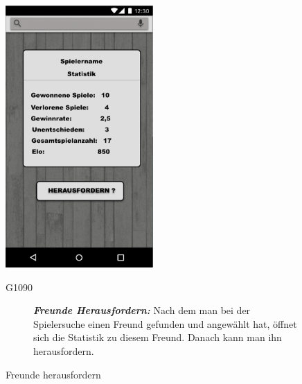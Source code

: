 \documentclass[parskip=full]{scrartcl}
\begin{document}
\begin{figure}[htp]
	\begin{minipage}[t]{6cm}
		\vspace{0pt}
		\includegraphics[height=100mm]{spielerprofil.png}
		\caption{Freunde herausfordern}
		\label{fig:Freunde herausforern}
	\end{minipage}
	\hfill
	\begin{minipage}[t]{6cm}
		\vspace{0pt}
		\begin{description}
			\item[G1090] \textbf{\textit{Freunde Herausfordern: }} Nach dem man bei der Spielersuche einen Freund gefunden und angewählt hat, öffnet sich die Statistik zu diesem Freund. Danach kann man ihn herausfordern.
		\end{description}
	\end{minipage}


\end{figure}
\end{document}
